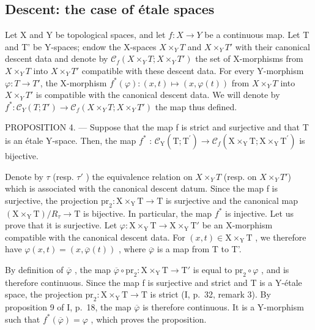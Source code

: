\subsection{Descent: the case of étale spaces}

Let X and Y be topological spaces, and let \(f\colon X\to Y\) be a continuous map. Let T and T' be Y-spaces; endow the X-spaces \(X\times_{Y}T\) and \(X\times_{Y}T'\) with their canonical descent data and denote by \(\mathcal{C}_{f}(X\times_{Y}T;X\times_{Y}T')\) the set of X-morphisms from \(X\times_{Y}T\) into \(X\times_{Y}T'\) compatible with these descent data. For every Y-morphism \(\varphi\colon T\to T'\), the X-morphism \(f^{*}(\varphi)\colon(x,t)\mapsto(x,\varphi(t))\) from \(X\times_{Y}T\) into \(X\times_{Y}T'\) is compatible with the canonical descent data. We will denote by \(f^{*}\colon\mathcal{C}_{Y}(T;T')\to\mathcal{C}_{f}(X\times_{Y}T;X\times_{Y}T')\) the map thus defined.

PROPOSITION 4. --- Suppose that the map f is strict and surjective and that T is an étale Y-space. Then, the map \(f^{*}\) : \(\mathcal{C}_{\mathrm{Y}}(\mathrm{T};\mathrm{T}^{\prime}) \to \mathcal{C}_{f}(\mathrm{X} \times_{\mathrm{Y}} \mathrm{T}; \mathrm{X} \times_{\mathrm{Y}} \mathrm{T}^{\prime})\) is bijective.

Denote by \(\tau\) (resp. \(\tau'\) ) the equivalence relation on \(X\times_{Y}T\) (resp. on \(X\times_{Y}T'\)) which is associated with the canonical descent datum. Since the map f is surjective, the projection \(\mathrm{pr}_2\colon \mathrm{X}\times_{\mathrm{Y}}\mathrm{T} \to \mathrm{T}\) is surjective and the canonical map \((\mathrm{X}\times_{\mathrm{Y}}\mathrm{T})/R_{\tau} \to \mathrm{T}\) is bijective. In particular, the map \(f^*\) is injective. Let us prove that it is surjective. Let \(\varphi\colon \mathrm{X}\times_{\mathrm{Y}}\mathrm{T} \to \mathrm{X}\times_{\mathrm{Y}}\mathrm{T}'\) be an X-morphism compatible with the canonical descent data. For \((x,t) \in \mathrm{X}\times_{\mathrm{Y}}\mathrm{T}\) , we therefore have \(\varphi(x,t) = (x,\overline{\varphi}(t))\) , where \(\overline{\varphi}\) is a map from T to T'.

By definition of \(\overline{\varphi}\) , the map \(\overline{\varphi} \circ \mathrm{pr}_2: \mathrm{X} \times_{\mathrm{Y}} \mathrm{T} \to \mathrm{T}'\) is equal to \(\mathrm{pr}_2 \circ \varphi\) , and is therefore continuous. Since the map f is surjective and strict and T is a Y-étale space, the projection \(\mathrm{pr}_2: \mathrm{X} \times_{\mathrm{Y}} \mathrm{T} \to \mathrm{T}\) is strict (I, p.~32, remark 3). By proposition 9 of I, p.~18, the map \(\overline{\varphi}\) is therefore continuous. It is a Y-morphism such that \(f^*(\overline{\varphi}) = \varphi\) , which proves the proposition.

